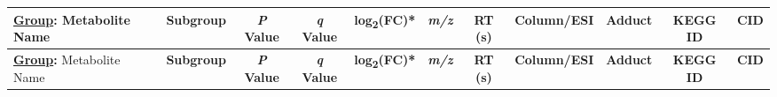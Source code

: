 \begingroup\fontsize{7}{9}\selectfont

\begin{longtable}[t]{llccccccccc}
\toprule[0.5pt]
\fontsize{9pt}{10.8pt}\selectfont\textbf{\underline{Group}:} Metabolite Name & \fontsize{9pt}{10.8pt}\selectfont\textbf{Subgroup} & \fontsize{9pt}{10.8pt}\selectfont\textbf{\textit{P} Value} & \fontsize{9pt}{10.8pt}\selectfont\textbf{\textit{q} Value} & \fontsize{9pt}{10.8pt}\selectfont\textbf{log\textsubscript{2}(FC)*} & \fontsize{9pt}{10.8pt}\selectfont\textbf{\textit{m/z}} & \fontsize{9pt}{10.8pt}\selectfont\textbf{RT (s)} & \fontsize{9pt}{10.8pt}\selectfont\textbf{Column/ESI} & \fontsize{9pt}{10.8pt}\selectfont\textbf{Adduct} & \fontsize{9pt}{10.8pt}\selectfont\textbf{KEGG ID} & \fontsize{9pt}{10.8pt}\selectfont\textbf{CID}\\
\midrule[0.5pt]
\endfirsthead
\toprule[0.5pt]
\fontsize{9pt}{10.8pt}\selectfont\textbf{\underline{Group}:} Metabolite Name & \fontsize{9pt}{10.8pt}\selectfont\textbf{Subgroup} & \fontsize{9pt}{10.8pt}\selectfont\textbf{\textit{P} Value} & \fontsize{9pt}{10.8pt}\selectfont\textbf{\textit{q} Value} & \fontsize{9pt}{10.8pt}\selectfont\textbf{log\textsubscript{2}(FC)*} & \fontsize{9pt}{10.8pt}\selectfont\textbf{\textit{m/z}} & \fontsize{9pt}{10.8pt}\selectfont\textbf{RT (s)} & \fontsize{9pt}{10.8pt}\selectfont\textbf{Column/ESI} & \fontsize{9pt}{10.8pt}\selectfont\textbf{Adduct} & \fontsize{9pt}{10.8pt}\selectfont\textbf{KEGG ID} & \fontsize{9pt}{10.8pt}\selectfont\textbf{CID}\\
\midrule[0.5pt]
\endhead


\end{longtable}
